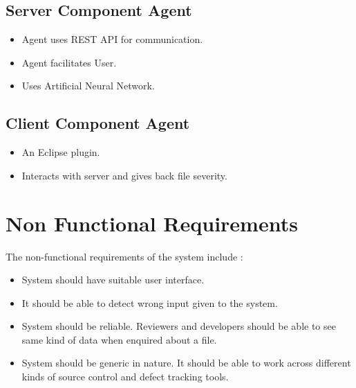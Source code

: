 \documentclass[oneside,a4paper,12pt]{book}
\begin{document}
\subsection{Server Component Agent}

\setlength{\parskip}{0.0pt}
\begin{itemize}
	\item Agent uses REST API for communication.\par

	\item Agent facilitates User.\par

	\item Uses Artificial Neural Network.
\end{itemize}\par

\subsection{Client Component Agent}
\begin{itemize}
	\item An Eclipse plugin.\par

	\item Interacts with server and gives back file severity.
\end{itemize}\par

\newpage
\section{Non Functional Requirements}

\begin{justify}
The non-functional requirements of the system include :
\end{justify}\par

\setlength{\parskip}{0.0pt}
\begin{itemize}
	\item System should have suitable user interface.\par

	\item It should be able to detect wrong input given to the system.\par

	\item System should be reliable. Reviewers and developers should be able to see same kind of data when enquired about a file.\par


	\item System should be generic in nature. It should be able to work across different kinds of source control and defect tracking tools.
\end{itemize}\par
\end{document}
